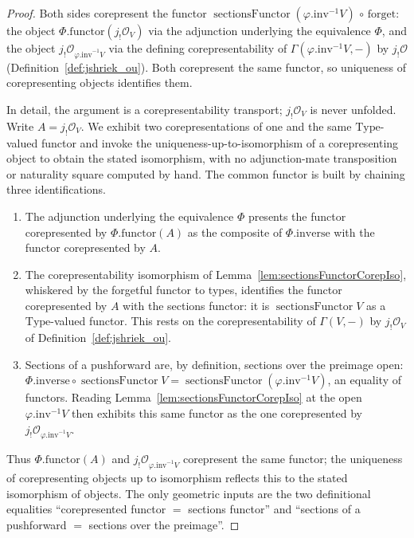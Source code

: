 \begin{proof}
  Both sides corepresent the functor \(\operatorname{sectionsFunctor}(\varphi.\mathrm{inv}^{-1}V)
  \,\circ\, \mathrm{forget}\): the object \(\Phi.\mathrm{functor}(j_!\mathcal{O}_V)\) via the
  adjunction underlying the equivalence \(\Phi\), and the object
  \(j_!\mathcal{O}_{\varphi.\mathrm{inv}^{-1}V}\) via the defining corepresentability of
  \(\Gamma(\varphi.\mathrm{inv}^{-1}V,{-})\) by \(j_!\mathcal{O}\)
  (Definition~\ref{def:jshriek_ou}). Both corepresent the same functor, so uniqueness of
  corepresenting objects identifies them.

  In detail, the argument is a corepresentability transport; \(j_!\mathcal{O}_V\) is never unfolded.
  Write \(A = j_!\mathcal{O}_V\). We exhibit two corepresentations of one and the same
  \(\mathrm{Type}\)-valued functor and invoke the uniqueness-up-to-isomorphism of a corepresenting
  object to obtain the stated isomorphism, with no adjunction-mate transposition or naturality square
  computed by hand. The common functor is built by chaining three identifications.
  \begin{enumerate}
    \item The adjunction underlying the equivalence \(\Phi\) presents the functor corepresented by
      \(\Phi.\mathrm{functor}(A)\) as the composite of \(\Phi.\mathrm{inverse}\) with the functor
      corepresented by \(A\).
    \item The corepresentability isomorphism of Lemma~\ref{lem:sectionsFunctorCorepIso}, whiskered by the
      forgetful functor to types, identifies the functor corepresented by \(A\) with the sections
      functor: it is \(\operatorname{sectionsFunctor} V\) as a \(\mathrm{Type}\)-valued functor. This
      rests on the corepresentability of \(\Gamma(V,-)\) by \(j_!\mathcal{O}_V\) of
      Definition~\ref{def:jshriek_ou}.
    \item Sections of a pushforward are, by definition, sections over the preimage open:
      \(\Phi.\mathrm{inverse} \circ \operatorname{sectionsFunctor} V =
      \operatorname{sectionsFunctor}(\varphi.\mathrm{inv}^{-1}V)\), an equality of functors. Reading
      Lemma~\ref{lem:sectionsFunctorCorepIso} at the open \(\varphi.\mathrm{inv}^{-1}V\) then exhibits
      this same functor as the one corepresented by \(j_!\mathcal{O}_{\varphi.\mathrm{inv}^{-1}V}\).
  \end{enumerate}
  Thus \(\Phi.\mathrm{functor}(A)\) and \(j_!\mathcal{O}_{\varphi.\mathrm{inv}^{-1}V}\) corepresent the
  same functor; the uniqueness of corepresenting objects up to isomorphism reflects this to the stated
  isomorphism of objects. The only geometric inputs are the two definitional equalities
  ``corepresented functor \(=\) sections functor'' and ``sections of a pushforward \(=\) sections over
  the preimage''.
\end{proof}

